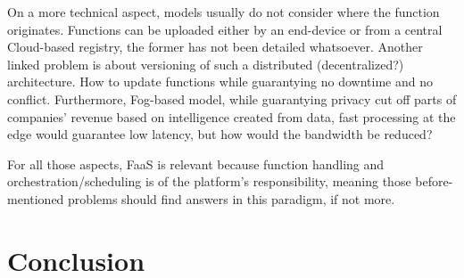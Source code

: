 \documentclass[11pt]{sdm}
\begin{document}
On a more technical aspect, models usually do not consider where the function originates. Functions can be uploaded either by an end-device or from a central Cloud-based registry, the former has not been detailed whatsoever. Another linked problem is about versioning of such a distributed (decentralized?) architecture. How to update functions while guarantying no downtime and no conflict. Furthermore, Fog-based model, while guarantying privacy cut off parts of companies' revenue based on intelligence created from data, fast processing at the edge would guarantee low latency, but how would the bandwidth be reduced?

For all those aspects, \gls{FaaS} is relevant because function handling and orchestration/scheduling is of the platform's responsibility, meaning those before-mentioned problems should find answers in this paradigm, if not more.


\section{Conclusion}

\printbibliography 
\end{document}
